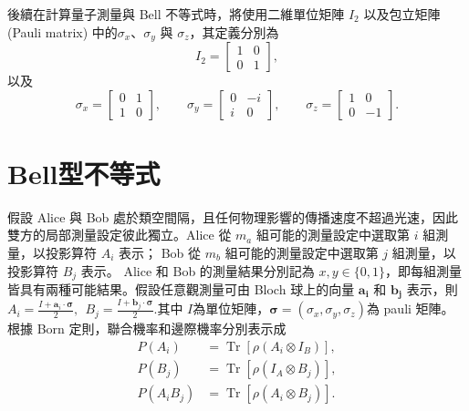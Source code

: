 \documentclass[12pt, a4paper, twoside, reqno]{article}
\begin{document}
\indent 後續在計算量子測量與 Bell 不等式時，將使用二維單位矩陣
$I_2$ 以及包立矩陣 (Pauli matrix) 中的$\sigma_x$、$\sigma_y$ 與 $\sigma_z$，其定義分別為
\[
    I_2=
    \begin{bmatrix}
        1 & 0\\
        0 & 1
    \end{bmatrix},
    \label{eq:identity-matrix}
\]
\noindent 以及
\[
    \sigma_x=
    \begin{bmatrix}
        0 & 1\\
        1 & 0
    \end{bmatrix},
    \qquad
    \sigma_y=
    \begin{bmatrix}
        0 & -i\\
        i & 0
    \end{bmatrix},
    \qquad
    \sigma_z=
    \begin{bmatrix}
        1 & 0\\
        0 & -1
    \end{bmatrix}.
    \label{eq:pauli-matrices}
\]

\section{Bell型不等式}
假設 Alice 與 Bob 處於類空間隔，且任何物理影響的傳播速度不超過光速，因此雙方的局部測量設定彼此獨立。Alice 從 $m_a$ 組可能的測量設定中選取第 $i$ 組測量，以投影算符 $A_i$ 表示； Bob 從 $m_b$ 組可能的測量設定中選取第 $j$ 組測量，以投影算符 $B_j$ 表示。 
Alice 和 Bob 的測量結果分別記為 $x,y \in \{0,1\}$，即每組測量皆具有兩種可能結果。假設任意觀測量可由 Bloch 球上的向量 $\bm{a_i}$ 和 $\bm{b_j}$ 表示，則 $A_i = \frac{I+\bm{a}_i \cdot \bm{\sigma}}{2},~~B_j = \frac{I+\bm{b}_j \cdot \bm{\sigma}}{2}.$其中 $I$為單位矩陣，$\bm{\sigma} = (\sigma_x,\sigma_y,\sigma_z)$為 pauli 矩陣。
根據 Born 定則，聯合機率和邊際機率分別表示成
\begin{align}
    P(A_i) &= \operatorname{Tr}\left[\rho\left(A_i \otimes I_B\right)\right],
    \label{eq:alice-marginal-probability}\\
    P(B_j) &= \operatorname{Tr}\left[\rho\left(I_A \otimes B_j\right)\right],
    \label{eq:bob-marginal-probability}\\
    P(A_iB_j) &= \operatorname{Tr}\left[\rho\left(A_i \otimes B_j\right)\right].
    \label{eq:joint-probability}
\end{align}
\end{document}
